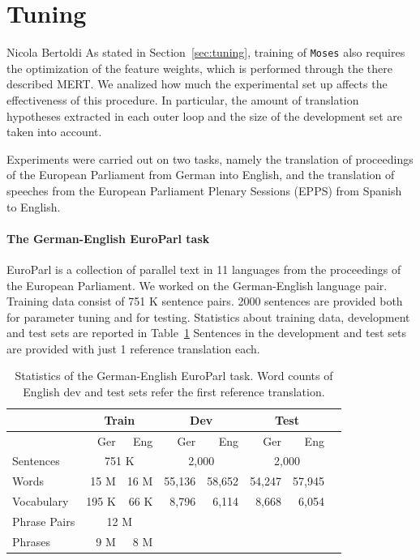 \documentclass[10pt]{report}
\theoremstyle{plain}
\begin{document}
{\section{Tuning}
{\sc Nicola Bertoldi}
\label{sec:exp-tuning}
As stated in Section~\ref{sec:tuning}, training of {\tt Moses} also requires the optimization of the feature weights, which is performed through the there described MERT. We analized how much the experimental set up affects the effectiveness of this procedure. In particular, the amount of translation hypotheses extracted in each outer loop and the size of the development set are taken into account.

Experiments were carried out on two tasks, namely the translation of proceedings of 
the European Parliament from German into English, and the translation  of  speeches from the  European Parliament Plenary Sessions (EPPS) from Spanish to English.

\paragraph{The German-English EuroParl task}
\label{sec:ge-en-europarl-task}
EuroParl \cite{koehn:europarl:mtsummit:2005} is a collection of parallel text in 11 languages from the proceedings of the European Parliament. We worked on the German-English language pair. Training data consist of 751 K sentence pairs. 2000 sentences are provided both for parameter tuning and for testing.  Statistics about training data, development and test sets are reported in Table~\ref{tbl:ge-en-europarl-data}
Sentences in the development and test sets are provided with just 1 reference translation each.  

\begin{table}[th]
\begin{center}
\begin{tabular}{lrr|rr|rrr}
        &  \multicolumn{2}{c|}{Train}   &  \multicolumn{2}{c|}{Dev}    &  \multicolumn{2}{c}{Test}\\
 \hline
        &  Ger   &   Eng  &  Ger   &   Eng  &  Ger   &   Eng     \\
 \hline
Sentences    & \multicolumn{2}{c|}{751 K} & \multicolumn{2}{c|}{2,000} & \multicolumn{2}{c}{2,000}\\
Words & 15 M & 16 M & 55,136 & 58,652 & 54,247 & 57,945\\
Vocabulary  & 195 K & 66 K & 8,796 & 6,114& 8,668 & 6,054&\\
Phrase Pairs  & \multicolumn{2}{c|}{12 M}\\
Phrases & 9 M & 8 M \\
\end{tabular}
\caption{Statistics of the German-English EuroParl task. Word counts of  English dev and test sets refer
 the first reference translation. }
\begin{center}
\end{center}
\label{tbl:ge-en-europarl-data}
\end{center}
\end{table}

}
\end{document}
